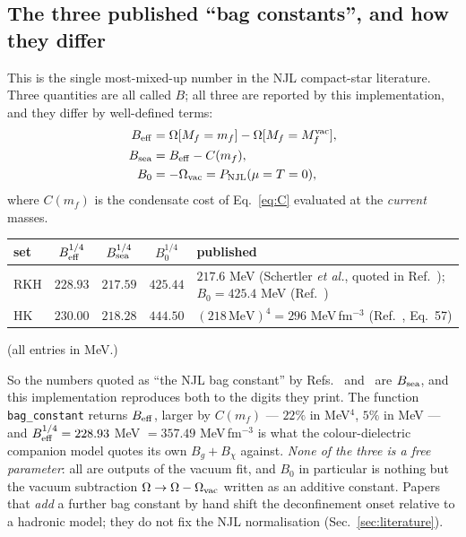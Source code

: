 \documentclass[aps,prc,onecolumn,superscriptaddress,nofootinbib,10pt]{revtex4-2}
\begin{document}
\subsection{The three published ``bag constants'', and how they differ}
\label{sec:bagconstants}

This is the single most-mixed-up number in the NJL compact-star literature.
Three quantities are all called $B$; all three are reported by this
implementation, and they differ by well-defined terms:
\begin{align}
  B_{\rm eff} &= \Omega[M_f = m_f] - \Omega[M_f = M_f^{\rm vac}] ,
  \label{eq:Beff2}\\
  B_{\rm sea} &= B_{\rm eff} - C(m_f) ,
  \label{eq:Bsea}\\
  B_0 &= -\Omega_{\rm vac} = P_{\rm NJL}(\mu = T = 0) ,
  \label{eq:B0}
\end{align}
where $C(m_f)$ is the condensate cost of Eq.~\eqref{eq:C}
evaluated at the \emph{current} masses.

\begin{center}
\footnotesize
\begin{tabular}{lccc p{}}
\toprule
set & $B_{\rm eff}^{1/4}$ & $B_{\rm sea}^{1/4}$ & $B_0^{1/4}$ & published \\
\midrule
RKH & $228.93$ & $\mathbf{217.59}$ & $\mathbf{425.44}$ &
  $217.6$ MeV (Schertler \textit{et al.}, quoted in Ref.~\cite{Pagliara2008});
  $B_0 = 425.4$ MeV (Ref.~\cite{Pagliara2008}) \\
HK  & $230.00$ & $\mathbf{218.28}$ & $444.50$ &
  $(218\,\text{MeV})^4 = 296$ MeV\,fm$^{-3}$ (Ref.~\cite{Baym2018}, Eq.~57) \\
\bottomrule
\end{tabular}
\end{center}
(all entries in MeV.)

So the numbers quoted as ``the NJL bag constant'' by Refs.~\cite{Baym2018}
and~\cite{Pagliara2008} are $B_{\rm sea}$, and this implementation reproduces
both to the digits they print. The function \texttt{bag\_constant} returns
$B_{\rm eff}$, larger by $C(m_f)$ --- $22\%$ in MeV$^4$, $5\%$ in
MeV --- and $B_{\rm eff}^{1/4} = 228.93$ MeV $= 357.49$ MeV\,fm$^{-3}$ is what
the colour-dielectric companion model quotes its own $B_g + B_\chi$ against.
\emph{None of the three is a free parameter}: all are outputs of the vacuum
fit, and $B_0$ in particular is nothing but the vacuum subtraction
$\Omega \to \Omega - \Omega_{\rm vac}$ written as an additive constant. Papers
that \emph{add} a further bag constant by hand shift the deconfinement onset
relative to a hadronic model; they do not fix the NJL normalisation
(Sec.~\ref{sec:literature}).
\end{document}
